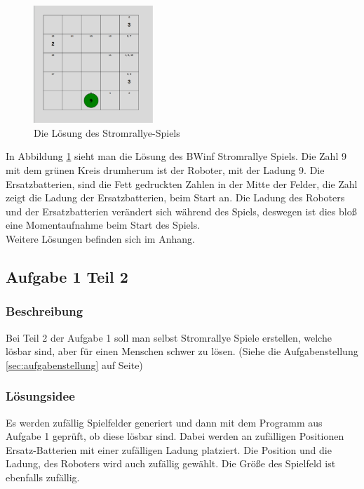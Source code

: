 \documentclass[a4paper,12pt,arial]{scrartcl}
\begin{document}
\begin{figure} 
    \vspace{-10pt}
    \includegraphics[width=0.4\textwidth]{Solution.pdf}
    \caption{Die Lösung des Stromrallye-Spiels}
    \label{fig:loesung1}
    \vspace{-35pt}
\end{figure}

In Abbildung \ref{fig:loesung1} sieht man die Lösung des BWinf Stromrallye Spiels. Die Zahl 9 mit dem grünen Kreis drumherum ist der Roboter, mit der Ladung 9.
Die Ersatzbatterien, sind die Fett gedruckten Zahlen in der Mitte der Felder, die Zahl zeigt die Ladung der Ersatzbatterien, beim Start an.
Die Ladung des Roboters und der Ersatzbatterien verändert sich während des Spiels, deswegen ist dies bloß eine Momentaufnahme beim Start des Spiels.
\\
Weitere Lösungen befinden sich im Anhang.
\\
\subsection{Aufgabe 1 Teil 2}
\subsubsection{Beschreibung}
Bei Teil 2 der Aufgabe 1 soll man selbst Stromrallye Spiele erstellen, welche lösbar sind, aber für einen Menschen schwer zu lösen.
(Siehe die Aufgabenstellung \ref{sec:aufgabenstellung} auf Seite\pageref{sec:aufgabenstellung})
\subsubsection{Lösungsidee}
Es werden zufällig Spielfelder generiert und dann mit dem Programm aus Aufgabe 1 geprüft, ob diese lösbar sind. Dabei werden an zufälligen Positionen Ersatz-Batterien mit einer zufälligen Ladung platziert. Die Position und die Ladung, des Roboters wird auch zufällig gewählt.
Die Größe des Spielfeld ist ebenfalls zufällig.
\end{document}
